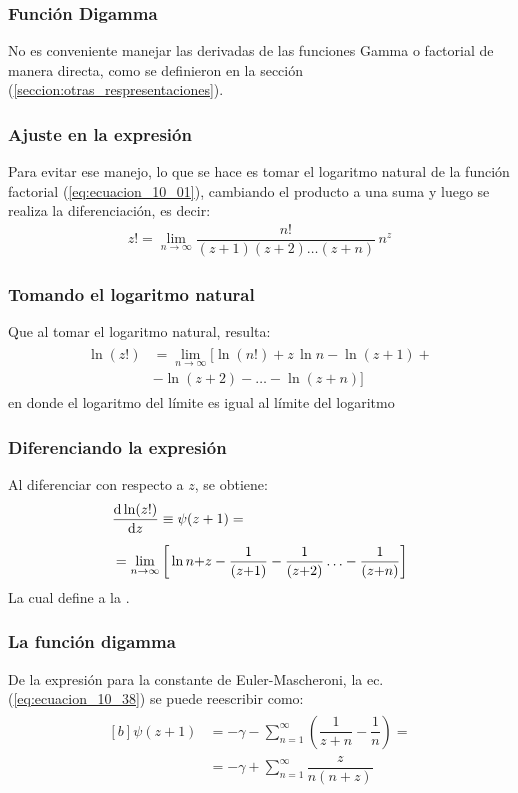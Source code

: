 \documentclass[12pt]{beamer}
\begin{document}
\begin{frame}
\frametitle{Función Digamma}
No es conveniente manejar las derivadas de las funciones Gamma o factorial de manera directa, como se definieron en la sección (\ref{seccion:otras_respresentaciones}).
\end{frame}
\begin{frame}
\frametitle{Ajuste en la expresión}
Para evitar ese manejo, lo que se hace es tomar el logaritmo natural de la función factorial (\ref{eq:ecuacion_10_01}), cambiando el producto a una suma y luego se realiza la diferenciación, es decir:
\pause
\begin{align}
z! = \lim_{n \to \infty} \dfrac{n!}{(z + 1)(z + 2) \ldots (z + n)} \, n^{z}
\label{eq:ecuacion_10_36}
\end{align}
\end{frame}
\begin{frame}
\frametitle{Tomando el logaritmo natural}
Que al tomar el logaritmo natural, resulta:
\pause
\begin{align}
\begin{aligned}
\ln (z!) &= \lim_{n \to \infty} \big[ \ln (n!) + z \, \ln n - \ln (z + 1) + \\[0.5em]
&- \ln (z + 2) - \ldots - \ln (z + n) \big]
\end{aligned}
\label{eq:ecuacion_10_37}
\end{align}
en donde el logaritmo del límite es igual al límite del logaritmo
\end{frame}
\begin{frame}
\frametitle{Diferenciando la expresión}
Al diferenciar con respecto a $z$, se obtiene:
\pause
\begin{align}
\begin{aligned}[b]
&\dv{\ln (z!)}{z} \equiv \psi(z + 1) = \\[0.5em]
&=\lim_{n \to \infty} \bigg[ \ln n {+} z - \dfrac{1}{(z {+} 1)} - \dfrac{1}{(z {+} 2)} \ldots - \dfrac{1}{(z {+} n)} \bigg]
\end{aligned}
\label{eq:ecuacion_10_38}
\end{align}
La cual define a la . 
\end{frame}
\begin{frame}
\frametitle{La función digamma}
De la expresión para la constante de Euler-Mascheroni, la ec. (\ref{eq:ecuacion_10_38}) se puede reescribir como:
\pause
\begin{align}
\begin{aligned}[b]
\psi (z + 1) &= - \gamma - \sum_{n=1}^{\infty} \left( \dfrac{1}{z + n} - \dfrac{1}{n} \right) = \\[0.5em]
&= -\gamma + \sum_{n=1}^{\infty} \dfrac{z}{n (n + z)}
\end{aligned}
\label{eq:ecuacion_10_39}
\end{align}
\end{frame}
\end{document}
